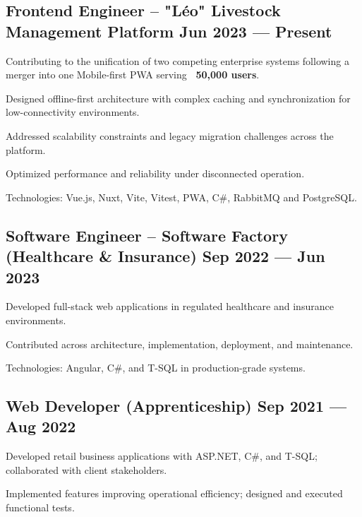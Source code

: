 \subsection{{Frontend Engineer – "Léo" Livestock Management Platform \hfill Jun 2023 --- Present}}
\begin{zitemize}
    \item Contributing to the unification of two competing enterprise systems following a merger into one Mobile-first PWA serving \textbf{~50,000 users}.
    \item Designed offline-first architecture with complex caching and synchronization for low-connectivity environments.
    \item Addressed scalability constraints and legacy migration challenges across the platform.
    \item Optimized performance and reliability under disconnected operation.
    \item Technologies: Vue.js, Nuxt, Vite, Vitest, PWA, C\#, RabbitMQ and PostgreSQL.
\end{zitemize}

\subsection{{Software Engineer – Software Factory (Healthcare \& Insurance) \hfill Sep 2022 --- Jun 2023}}
\begin{zitemize}
    \item Developed full-stack web applications in regulated healthcare and insurance environments.
    \item Contributed across architecture, implementation, deployment, and maintenance.
    \item Technologies: Angular, C\#, and T-SQL in production-grade systems.
\end{zitemize}

\subsection{{Web Developer (Apprenticeship) \hfill Sep 2021 --- Aug 2022}}
\begin{zitemize}
    \item Developed retail business applications with ASP.NET, C\#, and T-SQL; collaborated with client stakeholders.
    \item Implemented features improving operational efficiency; designed and executed functional tests.
\end{zitemize}
